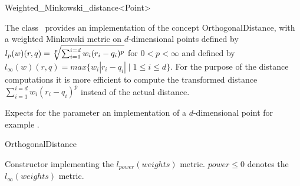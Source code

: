 

\begin{ccRefClass}{Weighted_Minkowski_distance<Point>}  %


\ccDefinition
  
The class \ccRefName\ provides an implementation of the concept OrthogonalDistance, with a weighted Minkowski metric
on $d$-dimensional points
defined by $l_p(w)(r,q)=\root p\of {\sum_{i=1}^{i=d} w_i(r_i-q_i)^p}$ for $0 < p <\infty$ and
defined by $l_{\infty}(w)(r,q)=max \{w_i |r_i-q_i| \mid 1 \leq i \leq d\}$.
For the purpose of the distance computations it is more efficient to compute
the transformed distance ${\sum_{i=1}^{i=d} w_i(r_i-q_i)^p}$ instead of the actual distance.


\ccParameters

Expects for the parameter
 an implementation
of a $d$-dimensional point
for example .

\ccIsModel

OrthogonalDistance

\ccTypes

 

\ccCreation
{}  %


{Constructor implementing the $l_{power}(weights)$ metric. $power \leq 0$ denotes the $l_{\infty}(weights)$ metric.}


\end{ccRefClass}

